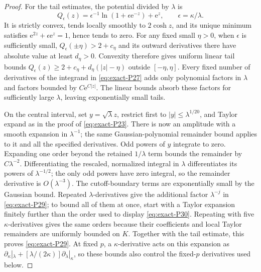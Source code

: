 \begin{proof}
For the tail estimates, the potential divided by \(\lambda\) is
\begin{equation}
 Q_\epsilon(z)=\epsilon^{-1}\ln(1+\epsilon \mathrm{e}^{-z})+\mathrm{e}^z,
 \qquad \epsilon=\kappa/\lambda.
\end{equation}
It is strictly convex, tends locally smoothly to \(2\cosh z\), and its unique minimum satisfies
\(\mathrm{e}^{2z}+\epsilon \mathrm{e}^z=1\), hence tends to zero.
For any fixed small \(\eta>0\), when \(\epsilon\) is sufficiently small,
\(Q_\epsilon(\pm\eta)>2+c_\eta\) and its outward derivatives there have absolute value at least \(d_\eta>0\). Convexity therefore gives uniform linear tail bounds
\(Q_\epsilon(z)\ge2+c_\eta+d_\eta(|z|-\eta)\) outside \([-\eta,\eta]\).
Every fixed number of derivatives of the integrand in \eqref{eq:exact-P27} adds only polynomial factors in \(\lambda\) and factors bounded by \(C \mathrm{e}^{C|z|}\). The linear bounds absorb these factors for sufficiently large \(\lambda\), leaving exponentially small tails.

On the central interval, set \(y=\sqrt\lambda z\), restrict first to \(|y|\le\lambda^{1/20}\), and Taylor expand as in the proof of \eqref{eq:exact-P23}. There is now an amplitude with a smooth expansion in \(\lambda^{-1}\); the same Gaussian-polynomial remainder bound applies to it and all the specified derivatives. Odd powers of \(y\) integrate to zero. Expanding one order beyond the retained \(1/\lambda\) term bounds the remainder by \(C\lambda^{-2}\). Differentiating the rescaled, normalized integral in \(\lambda\) differentiates its powers of \(\lambda^{-1/2}\); the only odd powers have zero integral, so the remainder derivative is \(O(\lambda^{-3})\). The cutoff-boundary terms are exponentially small by the Gaussian bound. Repeated \(\lambda\)-derivatives give the additional factor \(\lambda^{-j}\) in \eqref{eq:exact-P29}; to bound all of them at once, start with a Taylor expansion finitely further than the order used to display \eqref{eq:exact-P30}. Repeating with five \(\kappa\)-derivatives gives the same orders because their coefficients and local Taylor remainders are uniformly bounded on \(K\). Together with the tail estimate, this proves \eqref{eq:exact-P29}. At fixed \(p\), a \(\kappa\)-derivative acts on this expansion as \(\partial_\kappa|_\lambda+[\lambda/(2\kappa)]\partial_\lambda|_\kappa\), so these bounds also control the fixed-\(p\) derivatives used below.


\end{proof}
